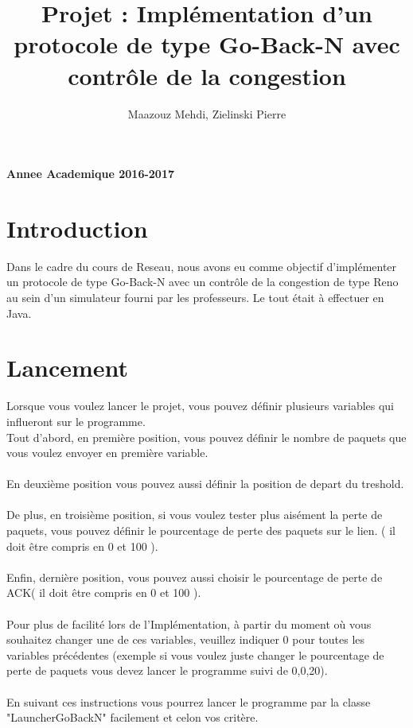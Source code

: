 \documentclass[a4paper,10pt]{article}
\title{Projet : Implémentation d'un protocole de type Go-Back-N avec contrôle de la congestion}
\author{Maazouz Mehdi, Zielinski Pierre}
\begin{document}
\maketitle
\textbf{Annee Academique 2016-2017}\\
\tableofcontents
\newpage

\section{Introduction}
Dans le cadre du cours de Reseau, nous avons eu comme objectif d'implémenter un protocole de type Go-Back-N
avec un contrôle de la congestion de type Reno au sein d'un simulateur fourni par les professeurs. Le tout était 
à effectuer en Java.

\section{Lancement}
Lorsque vous voulez lancer le projet, vous pouvez définir plusieurs variables qui influeront sur le programme.\\
Tout d'abord, en première position, vous pouvez définir le nombre de paquets que vous voulez envoyer en première variable.\\
\\
En deuxième position vous pouvez aussi définir la position de depart du treshold.\\
\\
De plus, en troisième position, si vous voulez tester plus aisément la perte de paquets, vous pouvez définir le pourcentage de perte des paquets sur le lien.
( il doit être compris en 0 et 100 ).\\
\\
Enfin, dernière position, vous pouvez aussi choisir le pourcentage de perte de ACK( il doit être compris en 0 et 100 ).\\
\\
Pour plus de facilité lors de l'Implémentation, à partir du moment où vous souhaitez changer une de ces variables, veuillez indiquer 0 pour toutes les variables précédentes (exemple si vous voulez juste changer le pourcentage de perte de paquets vous devez lancer le programme suivi de 0,0,20).\\
\\
En suivant ces instructions vous pourrez lancer le programme par la classe "LauncherGoBackN" facilement et celon vos critère.
\end{document}
